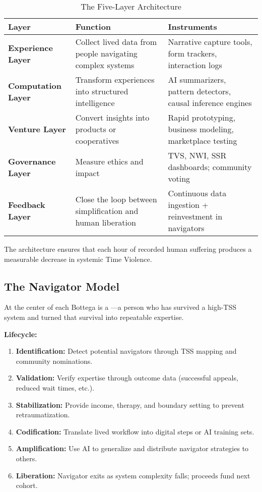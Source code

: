 \begin{table}[h]
\centering
\caption{The Five-Layer Architecture}
\label{tab:system-layers}
\begin{tabular}{p{3cm}p{5cm}p{5cm}}
\toprule
\textbf{Layer} & \textbf{Function} & \textbf{Instruments} \\
\midrule
\textbf{Experience Layer} & Collect lived data from people navigating complex systems & Narrative capture tools, form trackers, interaction logs \\
\addlinespace
\textbf{Computation Layer} & Transform experiences into structured intelligence & AI summarizers, pattern detectors, causal inference engines \\
\addlinespace
\textbf{Venture Layer} & Convert insights into products or cooperatives & Rapid prototyping, business modeling, marketplace testing \\
\addlinespace
\textbf{Governance Layer} & Measure ethics and impact & TVS, NWI, SSR dashboards; community voting \\
\addlinespace
\textbf{Feedback Layer} & Close the loop between simplification and human liberation & Continuous data ingestion + reinvestment in navigators \\
\bottomrule
\end{tabular}
\end{table}

The architecture ensures that each hour of recorded human suffering produces a measurable decrease in systemic Time Violence.

\subsection{The Navigator Model}
\label{sec:navigator-model}

At the center of each Bottega is a —a person who has survived a high-TSS system and turned that survival into repeatable expertise.

\textbf{Lifecycle:}
\begin{enumerate}
    \item \textbf{Identification:} Detect potential navigators through TSS mapping and community nominations.
    \item \textbf{Validation:} Verify expertise through outcome data (successful appeals, reduced wait times, etc.).
    \item \textbf{Stabilization:} Provide income, therapy, and boundary setting to prevent retraumatization.
    \item \textbf{Codification:} Translate lived workflow into digital steps or AI training sets.
    \item \textbf{Amplification:} Use AI to generalize and distribute navigator strategies to others.
    \item \textbf{Liberation:} Navigator exits as system complexity falls; proceeds fund next cohort.
\end{enumerate}

